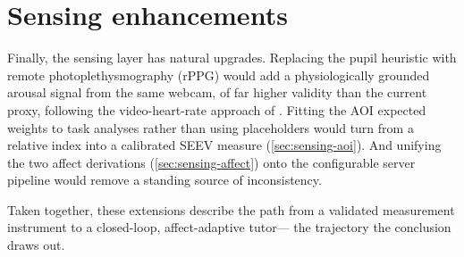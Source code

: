 \section{Sensing enhancements}
\label{sec:future-sensing}

Finally, the sensing layer has natural upgrades. Replacing the pupil
heuristic with remote photoplethysmography (rPPG) would add a
physiologically grounded arousal signal from the same webcam, of far
higher validity than the current proxy, following the video-heart-rate
approach of \citet{monkaresi2017}. Fitting the AOI expected weights to
task analyses rather than using placeholders would turn \allocscore{} from
a relative index into a calibrated SEEV measure
(\cref{sec:sensing-aoi}). And unifying the two affect derivations
(\cref{sec:sensing-affect}) onto the configurable server pipeline would
remove a standing source of inconsistency.

\medskip
\noindent Taken together, these extensions describe the path from a
validated measurement instrument to a closed-loop, affect-adaptive tutor---
the trajectory the conclusion draws out.
